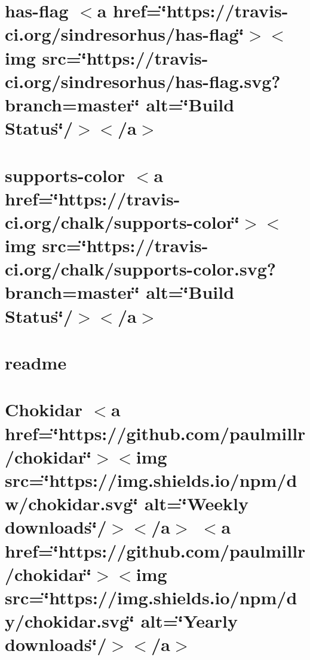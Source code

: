 \let\mypdfximage\pdfximage\def\pdfximage{\immediate\mypdfximage}\documentclass[twoside]{book}
\newcommand{\+}{\discretionary{\mbox{\scriptsize$\hookleftarrow$}}{}{}}
\begin{document}
\chapter{has-\/flag $<$a href=\char`\"{}https\+://travis-\/ci.\+org/sindresorhus/has-\/flag\char`\"{}$>$$<$img src=\char`\"{}https\+://travis-\/ci.\+org/sindresorhus/has-\/flag.\+svg?branch=master\char`\"{} alt=\char`\"{}\+Build Status\char`\"{}/$>$$<$/a$>$}
\label{md__c_1__git_hub__p_r_o_y_e_c_t_o-_i_i_i-_g_o_t_rest-api_node_modules_chalk_node_modules_has-flag_readme}

\chapter{supports-\/color $<$a href=\char`\"{}https\+://travis-\/ci.\+org/chalk/supports-\/color\char`\"{}$>$$<$img src=\char`\"{}https\+://travis-\/ci.\+org/chalk/supports-\/color.\+svg?branch=master\char`\"{} alt=\char`\"{}\+Build Status\char`\"{}/$>$$<$/a$>$}
\label{md__c_1__git_hub__p_r_o_y_e_c_t_o-_i_i_i-_g_o_t_rest-api_node_modules_chalk_node_modules_supports-color_readme}

\chapter{readme}
\label{md__c_1__git_hub__p_r_o_y_e_c_t_o-_i_i_i-_g_o_t_rest-api_node_modules_chalk_readme}

\chapter{Chokidar $<$a href=\char`\"{}https\+://github.\+com/paulmillr/chokidar\char`\"{}$>$$<$img src=\char`\"{}https\+://img.\+shields.\+io/npm/dw/chokidar.\+svg\char`\"{} alt=\char`\"{}\+Weekly downloads\char`\"{}/$>$$<$/a$>$ $<$a href=\char`\"{}https\+://github.\+com/paulmillr/chokidar\char`\"{}$>$$<$img src=\char`\"{}https\+://img.\+shields.\+io/npm/dy/chokidar.\+svg\char`\"{} alt=\char`\"{}\+Yearly downloads\char`\"{}/$>$$<$/a$>$}
\label{md__c_1__git_hub__p_r_o_y_e_c_t_o-_i_i_i-_g_o_t_rest-api_node_modules_chokidar__r_e_a_d_m_e}

\end{document}

